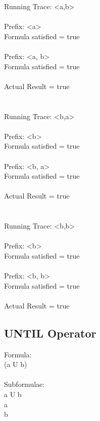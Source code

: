 \noindent Running Trace: \textless a,b\textgreater\\
\\
  Prefix: \textless a\textgreater\\
  Formula satisfied = true\\
\\
  Prefix: \textless a, b\textgreater\\
  Formula satisfied = true\\
\\
  Actual Result = true\\
\\
\\
Running Trace: \textless b,a\textgreater\\
\\
  Prefix: \textless b\textgreater\\
  Formula satisfied = true\\
\\
  Prefix: \textless b, a\textgreater\\
  Formula satisfied = true\\
\\
  Actual Result = true\\
\\
\\
Running Trace: \textless b,b\textgreater\\
\\
  Prefix: \textless b\textgreater\\
  Formula satisfied = true\\
\\
  Prefix: \textless b, b\textgreater\\
  Formula satisfied = true\\
\\
  Actual Result = true\\

\subsection{UNTIL Operator}

Formula:\\
(a U b)\\
\\
Subformulae:\\
a U b\\
a\\
b\\
\\

\newpage

